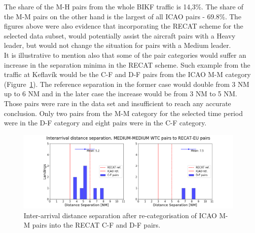 The share of the M-H pairs from the whole BIKF traffic is 14,3\%. The share of the M-M pairs on the other hand is the largest of all ICAO pairs - 69.8\%. The figures above were also evidence that incorporating the RECAT scheme for the selected data subset, would potentially assist the aircraft pairs with a Heavy leader, but would not change the situation for pairs with a Medium leader. \\
It is illustrative to mention also that some of the pair categories would suffer an increase in the separation minima in the RECAT scheme. Such example from the traffic at Keflavík would be the C-F and D-F pairs from the ICAO M-M category (Figure~\ref{fig:MM_to_CF_and_DF_pairs_dist_separ}). The reference separation in the former case would double from 3 NM up to 6 NM and in the later case the increase would be from 3 NM to 5 NM. Those pairs were rare in the data set and insufficient to reach any accurate conclusion. Only two pairs from the M-M category for the selected time period were in the D-F category and eight pairs were in the C-F category.
\begin{figure}[h]
    \centering
    \includegraphics[width=1\textwidth]{graphics/fig_MM_to_CF_and_DF_pairs_dist_separ.png}
    \caption[Inter-arrival distance separation of ICAO M-M pairs into the RECAT C-F and D-F pairs]{Inter-arrival distance separation after re-categorisation of ICAO M-M pairs into the RECAT C-F and D-F pairs.}
    \label{fig:MM_to_CF_and_DF_pairs_dist_separ}
\end{figure}


